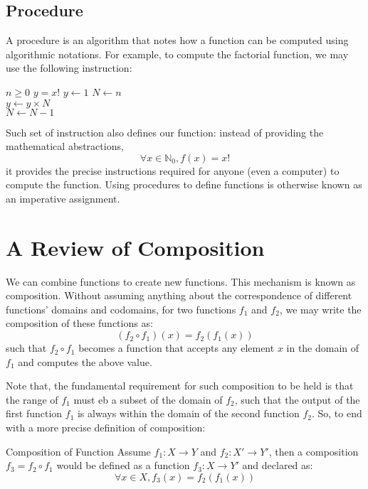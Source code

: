 \subsection{Procedure}
A procedure is an algorithm that notes how a function can be computed using algorithmic notations.
For example, to compute the factorial function, we may use the following instruction:
\begin{algorithm}
    \caption{A set of instructions for computing factorials}
    \begin{algorithmic}
        \Require $n \geq 0$
        \Ensure $y = x!$
        \State $y \gets 1$
        \State $N \gets n$
         \\
            $y \gets y \times N$ \\
            $N \gets N - 1$
        \EndWhile
    \end{algorithmic}
\end{algorithm}
Such set of instruction also defines our function: instead of providing the mathematical abstractions,
\[
    \forall x \in \mathbb{N}_0, f(x) = x!
\]
it provides the precise instructions required for anyone (even a computer) to compute the function.
Using procedures to define functions is otherwise known as an imperative assignment.

\section{A Review of Composition}
We can combine functions to create new functions. This mechanism is known as composition.
Without assuming anything about the correspondence of different functions' domains and codomains, for two functions $f_1$ and $f_2$, we may write the composition of these functions as:
\[
    (f_2 \circ f_1)(x) = f_2(f_1(x))
\]
such that $f_2 \circ f_1$ becomes a function that accepts any element $x$ in the domain of $f_1$ and computes the above value.

Note that, the fundamental requirement for such composition to be held is that the range of $f_1$ must eb a subset of the domain of $f_2$, such that the output of the first function $f_1$ is always within the domain of the second function $f_2$.
So, to end with a more precise definition of composition:
\begin{ln-define}{Composition of Function}{}
    Assume $f_1: X \rightarrow Y$ and $f_2: X' \rightarrow Y'$, then a composition $f_3 = f_2 \circ f_1$ would be defined as a function $f_3: X \rightarrow Y'$ and declared as:
    \[
        \forall x \in X, f_3(x) = f_2(f_1(x))
    \]
\end{ln-define}
